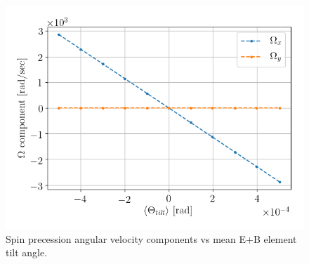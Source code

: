 \begin{figure}[h]\centering
	\includegraphics[width=\linewidth]{Figures/linearity_test_shifting_gauss_freq}
	\caption{Spin precession angular velocity components vs mean E+B element tilt angle.\label{fig:MDM_vs_tilt}}
\end{figure}